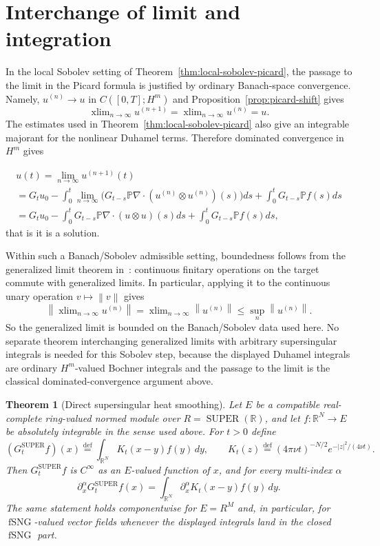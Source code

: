\documentclass{amsart}
\newtheorem{thm}{Theorem}
\DeclareMathOperator{\xlim}{xlim}
\DeclareMathOperator{\SUPER}{SUPER}
\DeclareMathOperator{\fSNG}{fSNG}
\newcommand{\eqdef}{\overset{\mathrm{def}}{=}}
\newcommand{\norm}[1]{\left\lVert #1\right\rVert}
\newcommand{\abs}[1]{\left\lvert #1\right\rvert}
\begin{document}
\section{Interchange of limit and integration}

In the local Sobolev setting of
Theorem~\ref{thm:local-sobolev-picard}, the passage to the limit in the
Picard formula is justified by ordinary Banach-space convergence.  Namely,
$u^{(n)}\to u$ in $C([0,T];H^m)$ and
Proposition~\ref{prop:picard-shift} gives
\[
  \xlim_{n\to\infty}u^{(n+1)}=\xlim_{n\to\infty}u^{(n)}=u.
\]
The estimates used in Theorem~\ref{thm:local-sobolev-picard} also give an
integrable majorant for the nonlinear Duhamel terms.  Therefore dominated
convergence in $H^m$ gives

\begin{multline*}
u(t) = \lim_{n\to\infty}u^{(n+1)}(t) \\
= G_t u_0 - \int_0^t \lim_{n\to\infty}
\bigl(G_{t-s} \mathbb{P}\nabla\cdot(u^{(n)}\otimes u^{(n)})(s)\bigr)ds
+ \int_0^t G_{t-s} \mathbb{P}f(s)ds \\
= G_t u_0 - \int_0^t G_{t-s} \mathbb{P}\nabla\cdot(u\otimes u)(s)ds
+ \int_0^t G_{t-s} \mathbb{P}f(s)ds,
\end{multline*}
that is it is a solution.

Within such a Banach/Sobolev admissible setting, boundedness follows from the
generalized limit theorem in~\cite{limit}: continuous finitary operations on
the target commute with generalized limits. In particular, applying it to the
continuous unary operation $v\mapsto \norm{v}$ gives
\[
  \norm{\xlim_{n\to\infty}u^{(n)}} = \xlim_{n\to\infty}\norm{u^{(n)}} \leq
  \sup_n \norm{u^{(n)}}.
\]
So the generalized limit is bounded on the Banach/Sobolev data used here.
No separate theorem interchanging generalized limits with arbitrary
supersingular integrals is needed for this Sobolev step, because the displayed
Duhamel integrals are ordinary $H^m$-valued Bochner integrals and the passage
to the limit is the classical dominated-convergence argument above.

\begin{thm}[Direct supersingular heat smoothing]\label{thm:super-heat-smoothing}
Let $E$ be a compatible real-complete ring-valued normed module over
$R=\SUPER(\mathbb{R})$, and let
$f:\mathbb{R}^N\to E$ be absolutely integrable in the sense used above.  For
$t>0$ define
\[
  (G_t^{\SUPER}f)(x)
  \eqdef \int_{\mathbb{R}^N}
  K_t(x-y)f(y)\,dy,
  \qquad
  K_t(z)\eqdef(4\pi\nu t)^{-N/2}e^{-\abs{z}^2/(4\nu t)} .
\]
Then $G_t^{\SUPER}f$ is $C^\infty$ as an $E$-valued function of $x$, and for
every multi-index $\alpha$
\[
  \partial_x^\alpha G_t^{\SUPER}f(x)
  =
  \int_{\mathbb{R}^N}\partial_x^\alpha K_t(x-y)f(y)\,dy .
\]
The same statement holds componentwise for $E=R^M$ and, in particular, for
$\fSNG$-valued vector fields whenever the displayed integrals land in the
closed $\fSNG$ part.
\end{thm}
\end{document}
